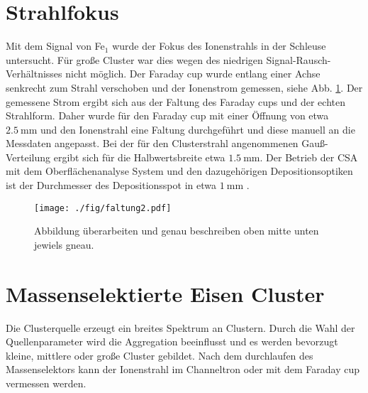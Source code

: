\section{Strahlfokus}
Mit dem  Signal von Fe$_1$ wurde der Fokus des Ionenstrahls in der Schleuse untersucht.
Für große Cluster war dies wegen des niedrigen Signal-Rausch-Verhältnisses nicht möglich.
Der Faraday cup wurde entlang einer Achse senkrecht zum Strahl verschoben und der Ionenstrom gemessen, siehe Abb. \ref{fig:faltung}.
Der gemessene Strom ergibt sich aus der Faltung des Faraday cups und der echten Strahlform.
Daher wurde für den Faraday cup mit einer Öffnung von etwa $\SI{2.5}{\mm}$ und den Ionenstrahl eine Faltung durchgeführt und diese manuell an die Messdaten angepasst.
Bei der für den Clusterstrahl angenommenen Gauß-Verteilung ergibt sich für die Halbwertsbreite etwa $\SI{1.5}{\mm}$.
Der Betrieb der CSA mit dem Oberflächenanalyse System und den dazugehörigen Depositionsoptiken ist der Durchmesser des Depositionsspot in etwa $\SI{1}{\mm}$ \cite[S. 40]{gronhagen}.

\begin{figure}
    \centering
    \texttt{[image: ./fig/faltung2.pdf]}
    \caption{Abbildung überarbeiten und genau beschreiben oben mitte unten jewiels gneau.}
    \label{fig:faltung}
\end{figure}


\section{Massenselektierte Eisen Cluster}
Die Clusterquelle erzeugt ein breites Spektrum an Clustern.
Durch die Wahl der Quellenparameter wird die Aggregation beeinflusst und es werden bevorzugt kleine, mittlere oder große Cluster gebildet.
Nach dem durchlaufen des Massenselektors kann der Ionenstrahl im Channeltron oder mit dem Faraday cup vermessen werden.

